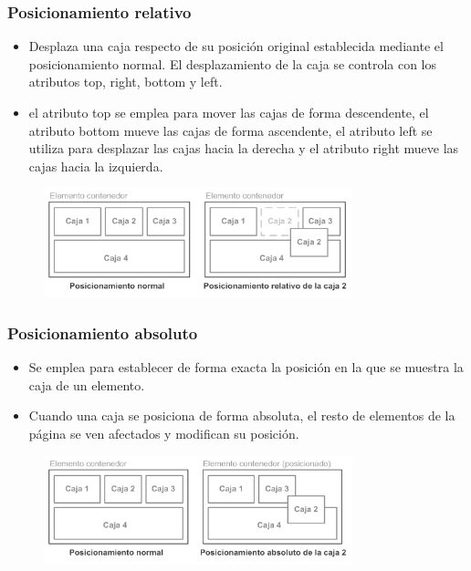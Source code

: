 \documentclass[ucs]{beamer}
\begin{document}
\begin{frame}
\frametitle{Posicionamiento relativo}

\begin{itemize}
  \item Desplaza una caja respecto de su posición original establecida mediante el posicionamiento normal. El desplazamiento de la caja se controla con los atributos top, right, bottom y left.
  \item el atributo top se emplea para mover las cajas de forma descendente, el atributo bottom mueve las cajas de forma ascendente, el atributo left se utiliza para desplazar las cajas hacia la derecha y el atributo right mueve las cajas hacia la izquierda. 
\end{itemize}

\begin{center}
\begin{figure}[p]
\includegraphics[width=0.8\textwidth]{figs/f0504.png}
\end{figure}
\end{center}

\end{frame}



\begin{frame}
\frametitle{Posicionamiento absoluto}

\begin{itemize}
  \item Se emplea para establecer de forma exacta la posición en la que se muestra la caja de un elemento. 
  \item Cuando una caja se posiciona de forma absoluta, el resto de elementos de la página se ven afectados y modifican su posición. 
\end{itemize}

\begin{center}
\begin{figure}[p]
\includegraphics[width=0.8\textwidth]{figs/f0516.png}
\end{figure}
\end{center}

\end{frame}
\end{document}
